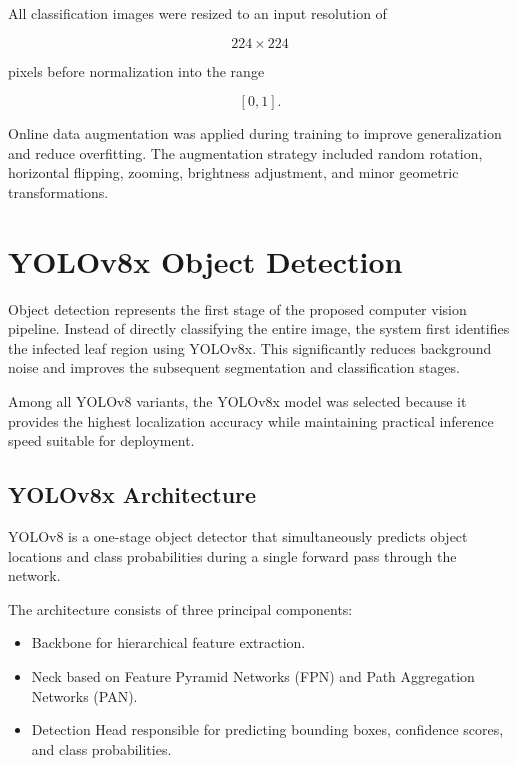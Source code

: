 All classification images were resized to an input resolution of

\[
224 \times 224
\]

pixels before normalization into the range

\[
[0,1].
\]

Online data augmentation was applied during training to improve generalization and reduce overfitting. The augmentation strategy included random rotation, horizontal flipping, zooming, brightness adjustment, and minor geometric transformations.

\section{YOLOv8x Object Detection}
\label{sec:yolo_methodology}

Object detection represents the first stage of the proposed computer vision pipeline. Instead of directly classifying the entire image, the system first identifies the infected leaf region using YOLOv8x. This significantly reduces background noise and improves the subsequent segmentation and classification stages.

Among all YOLOv8 variants, the YOLOv8x model was selected because it provides the highest localization accuracy while maintaining practical inference speed suitable for deployment.

\subsection{YOLOv8x Architecture}

YOLOv8 is a one-stage object detector that simultaneously predicts object locations and class probabilities during a single forward pass through the network.

The architecture consists of three principal components:

\begin{itemize}[leftmargin=*]
\item Backbone for hierarchical feature extraction.
\item Neck based on Feature Pyramid Networks (FPN) and Path Aggregation Networks (PAN).
\item Detection Head responsible for predicting bounding boxes, confidence scores, and class probabilities.
\end{itemize}

